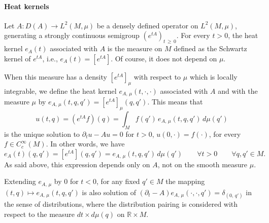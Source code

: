 \documentclass[AHL,Unicode,published]{cedram}
\newcommand*\R{\mathbb{R}}
\renewcommand{\geq}{\geqslant}
\let\oldforall\forall
\renewcommand*{\forall}{\mathrel{\oldforall}}
\begin{document}
\goodbreak
\paragraph{Heat kernels}
Let $A:D(A)\rightarrow L^2(M,\mu)$ be a densely defined operator on $L^2(M,\mu)$, generating a strongly continuous semigroup $(e^{tA})_{t\,\geq\,0}$. For every $t>0$, the heat kernel $e_A(t)$ associated with $A$ is the measure on $M$ defined as the Schwartz kernel of $e^{tA}$, i.e., $e_A(t)=[e^{tA}]$. Of course, it does not depend on $\mu$.


When this measure has a density $[e^{tA}]_\mu$ with respect to $\mu$ which is locally integrable, we define the heat kernel $e_{A,\,\mu}(t,\cdot,\cdot)$ associated with $A$ and with the measure $\mu$ by $e_{A,\,\mu}(t,q,q') = [e^{tA}]_\mu(q,q')$. This means that
\[
u(t,q) = \left(e^{tA}f\right)(q) = \int_M f(q')\, e_{A,\,\mu}(t,q,q')\, d\mu(q')
\]
is the unique solution to $\partial_t u-Au=0$ for $t>0$, $u(0,\cdot)=f(\cdot)$, for every $f\in C_c^\infty(M)$. In other words, we have
\[
e_A(t)(q,q') = \left[e^{tA}\right](q,q') = e_{A,\,\mu}(t,q,q')\, d\mu(q') \qquad\forall t>0\qquad \forall q,q'\in M.
\]
As said above, this expression depends only on $A$, not on the smooth measure $\mu$.


Extending $e_{A,\,\mu}$ by $0$ for $t<0$, for any fixed $q'\in M$ the mapping $(t,q)\mapsto e_{A,\,\mu}(t,q,q')$ is also solution of $(\partial_t-A)e_{A,\,\mu}(\cdot,\cdot,q')=\delta_{(0,\,q')}$ in the sense of distributions, where the distribution pairing is considered with respect to the measure $dt\times d\mu(q)$ on $\R\times M$.
\end{document}
